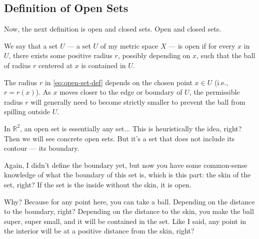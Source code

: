 \subsection{Definition of Open Sets}

\begin{speech}[00:04:52 - 00:05:52]
Now, the next definition  is open and closed sets. Open and closed sets.

We say that a set $U$ --- a set $U$ of my metric space $X$ --- is open  if for every $x$ in $U$, there exists some positive radius $r$, possibly depending on $x$, such that the ball of radius $r$ centered at $x$ is contained in $U$. 
\end{speech}

\begin{content}

\begin{steps}
The radius $r$ in \eqref{eq:open-set-def} depends on the chosen point $x \in U$ (i.e., $r = r(x)$). As $x$ moves closer to the edge or boundary of $U$, the permissible radius $r$ will generally need to become strictly smaller to prevent the ball from spilling outside $U$.
\end{steps}
\end{content}

\begin{speech}[00:05:52 - 00:07:12]
In $\mathbb{R}^2$, an open set is essentially any set... This is heuristically the idea, right? Then we will see concrete open sets. But it's a set that does not include its contour --- its boundary.

Again, I didn't define the boundary yet, but now you have some common-sense knowledge of what the boundary of this set is, which is this part: the skin of the set, right? If the set is the inside without the skin, it is open.

Why? Because for any point here, you can take a ball. Depending on the distance to the boundary, right? Depending on the distance to the skin, you make the ball super, super small, and it will be contained in the set. Like I said, any point in the interior will be at a positive distance from the skin, right?
\end{speech}

